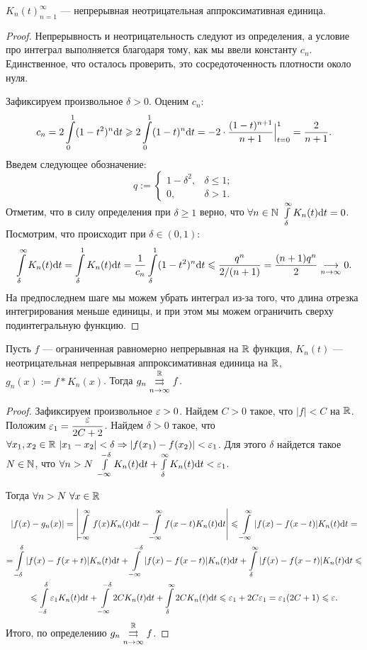 \begin{Lemma}\label{lemma1}
${K_n(t)}_{n = 1}^{\infty}$ --- непрерывная неотрицательная аппроксимативная единица.
\end{Lemma}
\begin{proof}
Непрерывность и неотрицательность следуют из определения, а условие про интеграл выполняется благодаря тому, как мы ввели константу $c_n$. Единственное, что осталось проверить, это сосредоточенность плотности около нуля.

Зафиксируем произвольное $\delta > 0$. Оценим $c_n$:
$$
c_n = 2 \int\limits_{0}^{1}(1 - t^2)^n \mathrm{d} t \geqslant 2 \int\limits_{0}^{1}(1 - t)^n\mathrm{d} t = -2 \cdot\dfrac{(1 - t)^{n + 1}}{n+1}\Big|_{t=0}^{1} = \dfrac{2}{n + 1}.
$$
Введем следующее обозначение:
$$
q := \begin{cases}
1 - \delta^2, & \delta \leq 1;\\
0, & \delta > 1.
\end{cases}
$$
Отметим, что в силу определения при $\delta \geq 1$ верно, что $\forall n \in \N \ \int\limits_{\delta}^{\infty}K_n(t)\d t = 0$. Посмотрим, что происходит при $\delta \in (0, 1)$:
$$
\int\limits_{\delta}^{\infty}K_n(t)\mathrm{d} t = \int\limits_{\delta}^1 K_n(t)\mathrm{d} t = \dfrac{1}{c_n}\int\limits_{\delta}^{1}(1 - t^2)^n \mathrm{d} t \leqslant \dfrac{q^n}{2/(n + 1)} = \dfrac{(n + 1)q^n}{2} \underset{n\to \infty}{\longrightarrow} 0.
$$
На предпоследнем шаге мы можем убрать интеграл из-за того, что длина отрезка интегрирования меньше единицы, и при этом мы можем ограничить сверху подинтегральную функцию.
\end{proof}

\begin{Lemma}
Пусть $f$ --- ограниченная равномерно непрерывная на $\mathbb{R}$ функция, $K_n(t)$ --- неотрицательная непрерывная аппроксимативная единица на $\mathbb{R}$, $g_n(x):= f * K_n(x)$. Тогда $g_n \overset{\mathbb{R}}{\underset{n \to \infty}{\rightrightarrows}} f$.
\end{Lemma}
\begin{proof}
Зафиксируем произвольное $\varepsilon > 0$. Найдем $C > 0$ такое, что $|f| < C$ на $\mathbb{R}$. Положим $\varepsilon_1 = \dfrac{\varepsilon}{2C + 2}$. Найдем $\delta > 0$ такое, что $\forall x_1, x_2 \in \mathbb{R}\  |x_1 - x_2| < \delta \Rightarrow |f(x_1) - f(x_2)| < \varepsilon_1$. Для этого $\delta$ найдется такое $N \in \mathbb{N}$, что $\forall n > N\ \int\limits_{-\infty}^{-\delta}K_n(t)\d t + \int\limits_{\delta}^{\infty}K_n(t) \d t < \eps_1$.

Тогда $\forall n > N\ \forall x \in \mathbb{R}$
\begin{gather*}
|f(x) - g_n(x)| = \left| \int\limits_{-\infty}^{\infty}f(x)K_n(t)\mathrm{d} t - \int\limits_{-\infty}^{\infty}f(x - t)K_n(t)\mathrm{d} t \right| \leqslant \int\limits_{-\infty}^{\infty}|f(x) - f(x - t)|K_n(t)\mathrm{d} t = \\
= \int\limits_{-\delta}^{\delta}|f(x) - f(x + t)| K_n(t)\mathrm{d} t + \int\limits_{-\infty}^{-\delta} |f(x) - f(x - t)|K_n(t)\mathrm{d} t + \int\limits_{\delta}^{\infty} |f(x) - f(x - t)|K_n(t)\mathrm{d} t \leqslant \\
\leqslant \int\limits_{-\delta}^{\delta}\varepsilon_1 K_n(t)\mathrm{d} t + \int\limits_{-\infty}^{-\delta}2C K_n(t) \mathrm{d} t + \int\limits_{\delta}^{\infty}2C K_n(t) \mathrm{d} t \leqslant \varepsilon_1 + 2C\varepsilon_1 = \varepsilon_1(2C + 1) \leqslant \varepsilon.
\end{gather*}
Итого, по определению $g_n \overset{\mathbb{R}}{\underset{n \to \infty}{\rightrightarrows}} f$.
\end{proof}


